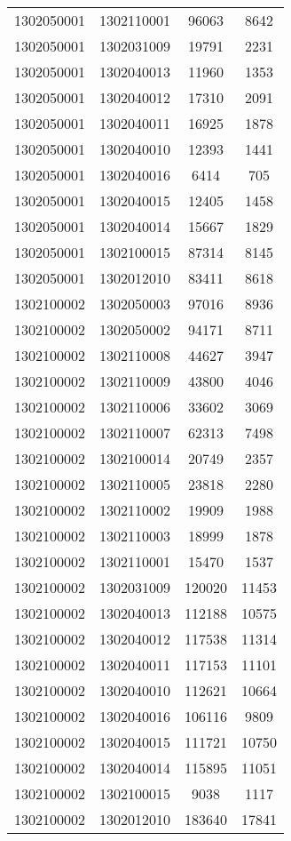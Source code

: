 \begin{longtable}[h]{llcc}
		1302050001 & 1302110001 & 96063 & 8642\\
		1302050001 & 1302031009 & 19791 & 2231\\
		1302050001 & 1302040013 & 11960 & 1353\\
		1302050001 & 1302040012 & 17310 & 2091\\
		1302050001 & 1302040011 & 16925 & 1878\\
		1302050001 & 1302040010 & 12393 & 1441\\
		1302050001 & 1302040016 & 6414 & 705\\
		1302050001 & 1302040015 & 12405 & 1458\\
		1302050001 & 1302040014 & 15667 & 1829\\
		1302050001 & 1302100015 & 87314 & 8145\\
		1302050001 & 1302012010 & 83411 & 8618\\
		1302100002 & 1302050003 & 97016 & 8936\\
		1302100002 & 1302050002 & 94171 & 8711\\
		1302100002 & 1302110008 & 44627 & 3947\\
		1302100002 & 1302110009 & 43800 & 4046\\
		1302100002 & 1302110006 & 33602 & 3069\\
		1302100002 & 1302110007 & 62313 & 7498\\
		1302100002 & 1302100014 & 20749 & 2357\\
		1302100002 & 1302110005 & 23818 & 2280\\
		1302100002 & 1302110002 & 19909 & 1988\\
		1302100002 & 1302110003 & 18999 & 1878\\
		1302100002 & 1302110001 & 15470 & 1537\\
		1302100002 & 1302031009 & 120020 & 11453\\
		1302100002 & 1302040013 & 112188 & 10575\\
		1302100002 & 1302040012 & 117538 & 11314\\
		1302100002 & 1302040011 & 117153 & 11101\\
		1302100002 & 1302040010 & 112621 & 10664\\
		1302100002 & 1302040016 & 106116 & 9809\\
		1302100002 & 1302040015 & 111721 & 10750\\
		1302100002 & 1302040014 & 115895 & 11051\\
		1302100002 & 1302100015 & 9038 & 1117\\
		1302100002 & 1302012010 & 183640 & 17841\\

\end{longtable}
